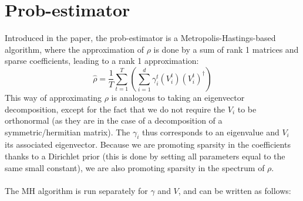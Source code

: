 \documentclass[12pt]{memoir}
\begin{document}
\section{Prob-estimator}
Introduced in the \cite{MA17} paper, the prob-estimator is a Metropolis-Hastings-based algorithm, where the approximation of $\rho$ is done by a sum of rank 1 matrices and sparse coefficients, leading to a rank 1 approximation:  
\begin{equation}
\hat \rho = \frac{1}{T}\sum_{t=1}^T  \left(
\sum_{i=1}^d \gamma_i^t (V_i^t) (V_i^t)^{\dagger}  
\right)
\end{equation}
This way of approximating $\rho$ is analogous to taking an eigenvector decomposition, except for the fact that we do not require the $V_i$ to be orthonormal (as they are in the case of a decomposition of a symmetric/hermitian matrix). The $\gamma_i$ thus corresponds to an eigenvalue and $V_i$ its associated eigenvector. Because we are promoting sparsity in the coefficients thanks to a Dirichlet prior (this is done by setting all parameters equal to the same small constant), we are also promoting sparsity in the spectrum of $\rho$.\\\\
The MH algorithm is run separately for $\gamma$ and $V$, and can be written as follows:
\end{document}
